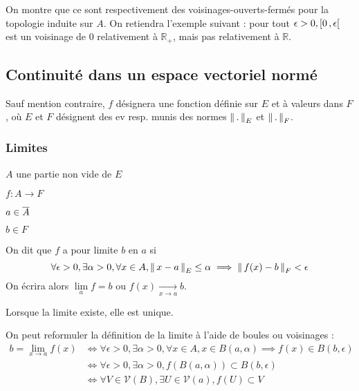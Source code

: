     On montre que ce sont respectivement des voisinages-ouverts-fermés pour la topologie induite sur $A$. On retiendra l’exemple suivant : pour tout $\epsilon > 0, \left[ 0 \, , \epsilon \right[$ est un voisinage de $0$ relativement à $\mathbb{R}_+$, mais pas relativement à $\mathbb{R}$.

\subsection{Continuité dans un espace vectoriel normé}

    Sauf mention contraire, $f$ désignera une fonction définie sur $E$ et à valeurs dans $F$, où $E$ et $F$ désignent des ev resp. munis des normes $\left\lVert\,.\,\right\rVert_E$ et $\left\lVert\,.\,\right\rVert_F$.

    \subsubsection{Limites}

    \begin{defi}{}{}
        \begin{soient}
            \item $A$ une partie non vide de $E$ 
            \item $f : A \rightarrow F$
            \item $a \in \overline{A}$
            \item $b \in F$
        \end{soient}
        On dit que $f$ a pour limite $b$ en $a$ si 
        \[ \forall \epsilon > 0, \exists \alpha > 0, \forall x \in A, \left\lVert\,x-a\,\right\rVert_E \leq \alpha \implies \left\lVert\,f(x)-b\,\right\rVert_F < \epsilon \] 
        On écrira alors $\lim\limits_{a} f = b$ ou $f(x) \underset{x \rightarrow a}{\longrightarrow} b$.
    \end{defi}

    Lorsque la limite existe, elle est unique.

    On peut reformuler la définition de la limite à l’aide de boules ou voisinages : 
    \begin{align*}
        b = \lim\limits_{x \rightarrow a}  f(x) & \iff \forall \epsilon > 0, \exists \alpha > 0, \forall x \in A, x \in B(a,\alpha) \implies f(x) \in B(b,\epsilon) \\
        & \iff \forall \epsilon > 0, \exists \alpha > 0, f\left(B(a,\alpha)\right) \subset B(b,\epsilon) \\
        & \iff \forall V \in \mathcal{V}(B), \exists U \in \mathcal{V}(a), f(U) \subset V
    \end{align*}

